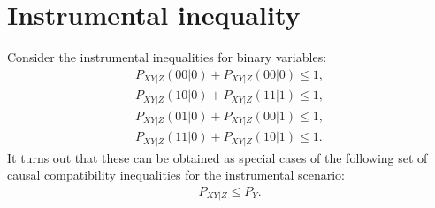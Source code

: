 \documentclass[aps,english,superscriptaddress,onecolumn,twoside,longbibliography,pra,floatfix,fleqn,nofootinbib]{revtex4-1}%
\theoremstyle{definition}
\begin{document}

\section{Instrumental inequality}

Consider  the instrumental inequalities for binary variables:
\begin{align}
P_{XY|Z}(00|0) +  P_{XY|Z}(00|0) \le 1,\nonumber\\
P_{XY|Z}(10|0) +  P_{XY|Z}(11|1) \le 1,\nonumber\\
P_{XY|Z}(01|0) +  P_{XY|Z}(00|1) \le 1,\nonumber\\
P_{XY|Z}(11|0) +  P_{XY|Z}(10|1) \le 1. \label{II1}
\end{align}
It turns out that these can be obtained as special cases of the following set of causal compatibility inequalities for the instrumental scenario:
\begin{align}
P_{XY|Z} \le P_Y.
\label{II2}
\end{align}
\end{document}
